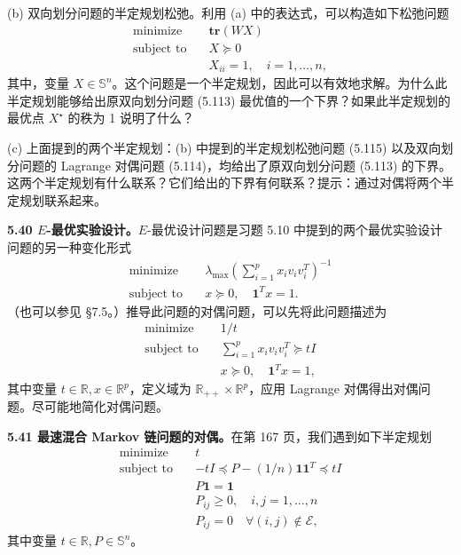 \documentclass[UTF8, 12pt, fontset=fandol, oneside]{ctexart}
\begin{document}
(b) 双向划分问题的半定规划松弛。利用 (a) 中的表达式，可以构造如下松弛问题
\begin{equation}
\begin{aligned}
\text{minimize}\quad & \mathbf{tr}(WX)\\
\text{subject to}\quad & X\succeq 0\\
& X_{ii}=1,\quad i=1,\ldots,n,
\end{aligned}
\tag{5.115}
\end{equation}
其中，变量 $X\in\mathbb{S}^n$。这个问题是一个半定规划，因此可以有效地求解。为什么此半定规划能够给出原双向划分问题 (5.113) 最优值的一个下界？如果此半定规划的最优点 $X^\star$ 的秩为 1 说明了什么？

(c) 上面提到的两个半定规划：(b) 中提到的半定规划松弛问题 (5.115) 以及双向划分问题的 Lagrange 对偶问题 (5.114)，均给出了原双向划分问题 (5.113) 的下界。这两个半定规划有什么联系？它们给出的下界有何联系？提示：通过对偶将两个半定规划联系起来。

\noindent\textbf{5.40 $E$-最优实验设计。}\quad $E$-最优设计问题是习题 5.10 中提到的两个最优实验设计问题的另一种变化形式
\[
\begin{aligned}
\text{minimize}\quad & \lambda_{\max}\left(\sum_{i=1}^p x_iv_iv_i^T\right)^{-1}\\
\text{subject to}\quad & x\succeq 0,\quad \mathbf{1}^Tx=1.
\end{aligned}
\]
（也可以参见 §7.5。）推导此问题的对偶问题，可以先将此问题描述为
\[
\begin{aligned}
\text{minimize}\quad & 1/t\\
\text{subject to}\quad & \sum_{i=1}^p x_iv_iv_i^T\succeq tI\\
& x\succeq 0,\quad \mathbf{1}^Tx=1,
\end{aligned}
\]
其中变量 $t\in\mathbb{R}, x\in\mathbb{R}^p$，定义域为 $\mathbb{R}_{++}\times\mathbb{R}^p$，应用 Lagrange 对偶得出对偶问题。尽可能地简化对偶问题。

\noindent\textbf{5.41 最速混合 Markov 链问题的对偶。}\quad 在第 167 页，我们遇到如下半定规划
\[
\begin{aligned}
\text{minimize}\quad & t\\
\text{subject to}\quad & -tI\preceq P-(1/n)\mathbf{1}\mathbf{1}^T\preceq tI\\
& P\mathbf{1}=\mathbf{1}\\
& P_{ij}\geq 0,\quad i,j=1,\ldots,n\\
& P_{ij}=0\quad \forall (i,j)\notin\mathcal{E},
\end{aligned}
\]
其中变量 $t\in\mathbb{R}, P\in\mathbb{S}^n$。
\end{document}
